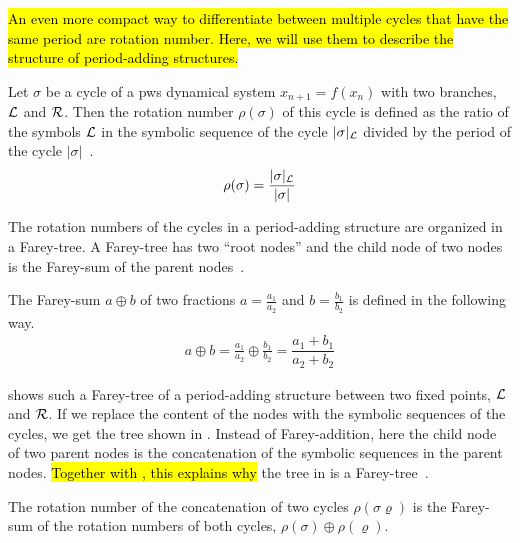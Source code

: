 \hl{
	An even more compact way to differentiate between multiple cycles that have the same period are rotation number.
	Here, we will use them to describe the structure of period-adding structures.
}

\begin{definition}
	Let $\sigma$ be a cycle of a \gls{pws} dynamical system $x_{n+1} = f(x_n)$ with two branches, $\mathcal{L}$ and $\mathcal{R}$.
	Then the rotation number $\rho(\sigma)$ of this cycle is defined as the ratio of the symbols $\mathcal{L}$ in the symbolic sequence of the cycle $|\sigma|_{\mathcal{L}}$ divided by the period of the cycle $|\sigma|$~\cite{Keener80}.
	\begin{align}
		\rho(\sigma) = \dfrac{|\sigma|_{\mathcal{L}}}{|\sigma|}
	\end{align}
\end{definition}

The rotation numbers of the cycles in a period-adding structure are organized in a Farey-tree.
A Farey-tree has two ``root nodes'' and the child node of two nodes is the Farey-sum of the parent nodes~\cite{granados14adding}.

\begin{definition}
	The Farey-sum $a \oplus b$ of two fractions $a = \frac{a_1}{a_2}$ and $b = \frac{b_1}{b_2}$ is defined in the following way.
	\begin{align}
		a \oplus b = \frac{a_1}{a_2} \oplus \frac{b_1}{b_2} = \dfrac{a_1 + b_1}{a_2 + b_2}
	\end{align}
\end{definition}

 shows such a Farey-tree of a period-adding structure between two fixed points, $\mathcal{L}$ and $\mathcal{R}$.
If we replace the content of the nodes with the symbolic sequences of the cycles, we get the tree shown in .
Instead of Farey-addition, here the child node of two parent nodes is the concatenation of the symbolic sequences in the parent nodes.
\hl{Together with , this explains why} the  tree in  is a Farey-tree~\cite{granados14adding}.

\begin{theorem}
	The rotation number of the concatenation of two cycles $\rho(\sigma\varrho)$ is the Farey-sum of the rotation numbers of both cycles, $\rho(\sigma) \oplus \rho(\varrho)$.
	\label{theorem:state.rot.num.concat}
\end{theorem}

